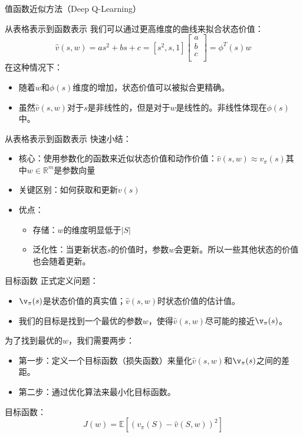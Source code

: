 \begin{section}{值函数近似方法\alert{（Deep Q-Learning）}}
\begin{frame}{从表格表示到函数表示}
   我们可以通过更高维度的曲线来拟合状态价值：
   \[
        \hat{v}(s,w)=as^2+bs+c=[s^2,s,1]\begin{bmatrix}
            a \\
            b \\
            c \\
        \end{bmatrix}=\phi^T(s)w
   \]
   在这种情况下：
   \begin{itemize}
    \item 随着$w$和$\phi(s)$维度的增加，状态价值可以被拟合更精确。
    \item 虽然$\hat{v}(s,w)$对于$s$是非线性的，但是对于$w$是线性的。非线性体现在$\phi(s)$中。
   \end{itemize}
\end{frame}

\begin{frame}{从表格表示到函数表示}
    快速小结：
    \begin{itemize}
     \item 核心：使用\alert{参数化的函数}来近似状态价值和动作价值：$\hat{v}(s,w)\approx v_\pi(s)$其中$w\in \mathbb{R}^m$是参数向量
     \item 关键区别：如何获取和更新$v(s)$
     \item 优点：
    \begin{itemize}
        \item 存储：$w$的维度明显低于$|S|$
        \item 泛化性：当更新状态$s$的价值时，参数$w$会更新。所以一些其他状态的价值也会随着更新。
    \end{itemize}
    \end{itemize}
\end{frame}

\begin{frame}{目标函数}
    正式定义问题：
    \begin{itemize}
        \item $\v_\pi(s)$是状态价值的\alert{真实值}；$\hat{v}(s,w)$时状态价值的\alert{估计值}。
        \item 我们的目标是找到一个最优的参数$w$，使得$\hat{v}(s,w)$尽可能的接近$\v_\pi(s)$。
    \end{itemize}
    为了找到最优的$w$，我们需要两步：
    \begin{itemize}
        \item 第一步：定义一个目标函数（损失函数）来量化$\hat{v}(s,w)$和$\v_\pi(s)$之间的差距。
        \item 第二步：通过优化算法来最小化目标函数。
    \end{itemize}
    \alert{目标函数：
        \[
            J(w)=\mathbb{E}[(v_\pi(S)-\hat{v}(S,w))^2]
        \]
    }
\end{frame}


\end{section}
